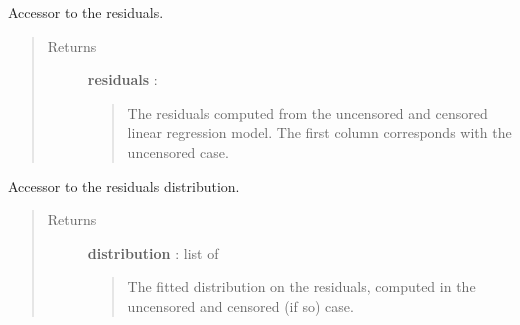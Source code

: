 \documentclass[letterpaper,10pt,english]{sphinxmanual}
\begin{document}
\begin{fulllineitems}
\begin{fulllineitems}
\label{_generated/otpod.UnivariateLinearModelAnalysis:otpod.UnivariateLinearModelAnalysis.getResiduals}
Accessor to the residuals.
\begin{quote}\begin{description}
\item[{Returns}] \leavevmode
\textbf{residuals} : \href{http://doc.openturns.org/openturns-latest/sphinx/user\_manual/\_generated/openturns.NumericalSample.html\#openturns.NumericalSample}{}
\begin{quote}

The residuals computed from the uncensored and censored linear
regression model. The first column corresponds with the uncensored case.
\end{quote}

\end{description}\end{quote}

\end{fulllineitems}


\begin{fulllineitems}
\label{_generated/otpod.UnivariateLinearModelAnalysis:otpod.UnivariateLinearModelAnalysis.getResidualsDistribution}
Accessor to the residuals distribution.
\begin{quote}\begin{description}
\item[{Returns}] \leavevmode
\textbf{distribution} : list of \href{http://doc.openturns.org/openturns-latest/sphinx/user\_manual/\_generated/openturns.Distribution.html\#openturns.Distribution}{}
\begin{quote}

The fitted distribution on the residuals, computed in the uncensored
and censored (if so) case.
\end{quote}

\end{description}\end{quote}

\end{fulllineitems}



\end{fulllineitems}
\end{document}
